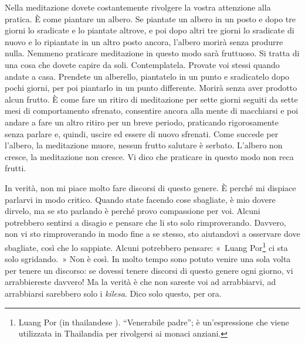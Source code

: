 Nella meditazione dovete costantemente rivolgere la vostra attenzione
alla pratica. È come piantare un albero. Se piantate un albero in un
posto e dopo tre giorni lo sradicate e lo piantate altrove, e poi dopo
altri tre giorni lo sradicate di nuovo e lo ripiantate in un altro posto
ancora, l'albero morirà senza produrre nulla. Nemmeno praticare
meditazione in questo modo sarà fruttuoso. Si tratta di una cosa che
dovete capire da soli. Contemplatela. Provate voi stessi quando andate a
casa. Prendete un alberello, piantatelo in un punto e sradicatelo dopo
pochi giorni, per poi piantarlo in un punto differente. Morirà senza
aver prodotto alcun frutto. È come fare un ritiro di meditazione per
sette giorni seguiti da sette mesi di comportamento sfrenato, consentire
ancora alla mente di macchiarsi e poi andare a fare un altro ritiro per
un breve periodo, praticando rigorosamente senza parlare e, quindi,
uscire ed essere di nuovo sfrenati. Come succede per l'albero, la
meditazione muore, nessun frutto salutare è serbato. L'albero non
cresce, la meditazione non cresce. Vi dico che praticare in questo modo
non reca frutti.

In verità, non mi piace molto fare discorsi di questo genere. È perché
mi dispiace parlarvi in modo critico. Quando state facendo cose
sbagliate, è mio dovere dirvelo, ma se sto parlando è perché provo
compassione per voi. Alcuni potrebbero sentirsi a disagio e pensare che
li sto solo rimproverando. Davvero, non vi sto rimproverando in modo
fine a se stesso, sto aiutandovi a osservare dove sbagliate, così che lo
sappiate. Alcuni potrebbero pensare: «~Luang Por\footnote{Luang Por (in
  thailandese ). ``Venerabile padre''; è un'espressione che viene
  utilizzata in Thailandia per rivolgersi ai monaci anziani.} ci sta
solo sgridando.~» Non è così. In molto tempo sono potuto venire una sola
volta per tenere un discorso: se dovessi tenere discorsi di questo
genere ogni giorno, vi arrabbiereste davvero! Ma la verità è che non
sareste voi ad arrabbiarvi, ad arrabbiarsi sarebbero solo i
\emph{kilesa}. Dico solo questo, per ora.


